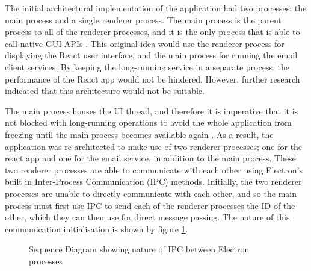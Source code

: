 The initial architectural implementation of the application had two processes: the main process and a single renderer process. The main process is the parent process to all of the renderer processes, and it is the only process that is able to call native GUI APIs \cite{electron-architecture}. This original idea would use the renderer process for displaying the React user interface, and the main process for running the email client services. By keeping the long-running service in a separate process, the performance of the React app would not be hindered. However, further research indicated that this architecture would not be suitable.

The main process houses the UI thread, and therefore it is imperative that it is not blocked with long-running operations to avoid the whole application from freezing until the main process becomes available again \cite{electron-performance}. As a result, the application was re-architected to make use of two renderer processes; one for the react app and one for the email service, in addition to the main process. These two renderer processes are able to communicate with each other using Electron's built in Inter-Process Communication (IPC) methods. Initially, the two renderer processes are unable to directly communicate with each other, and so the main process must first use IPC to send each of the renderer processes the ID of the other, which they can then use for direct message passing. The nature of this communication initialisation is shown by figure \ref{fig:sequence-ipc}.

\begin{figure}[h!]
\begin{center}
  \caption{Sequence Diagram showing nature of IPC between Electron processes}
  \label{fig:sequence-ipc}
\end{center}
\end{figure}


